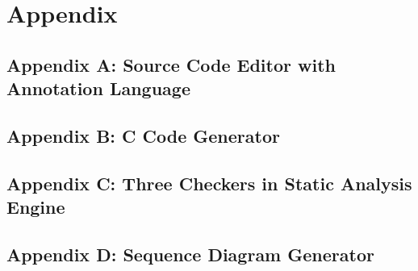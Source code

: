 \chapter{Appendix}
\section{Appendix A: Source Code Editor with Annotation Language}


\section{Appendix B: C Code Generator}	

	
	
	
	
\section{Appendix C: Three Checkers in Static Analysis Engine}

\section{Appendix D: Sequence Diagram Generator}
